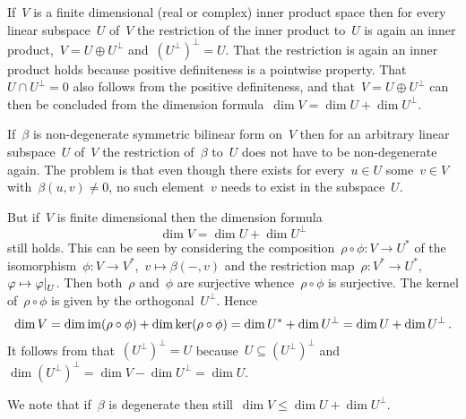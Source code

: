 \begin{recall}
  If~$V$ is a finite dimensional (real or complex) inner product space then for every linear subspace~$U$ of~$V$ the restriction of the inner product to~$U$ is again an inner product,~$V = U \oplus U^\perp$ and~$(U^\perp)^\perp = U$.
  That the restriction is again an inner product holds because positive definiteness is a pointwise property.
  That~$U \cap U^\perp = 0$ also follows from the positive definiteness, and that~$V = U \oplus U^\perp$ can then be concluded from the dimension formula~$\dim V = \dim U + \dim U^\perp$.
  
  If~$\beta$ is non-degenerate symmetric bilinear form on~$V$ then for an arbitrary linear subspace~$U$ of~$V$ the restriction of~$\beta$ to~$U$ does not have to be non-degenerate again.
  The problem is that even though there exists for every~$u \in U$ some~$v \in V$ with~$\beta(u,v) \neq 0$, no such element~$v$ needs to exist in the subspace~$U$.
  
  But if~$V$ is finite dimensional then the dimension formula
  \[
    \dim V
    =
    \dim U + \dim U^\perp
  \]
  still holds.
  This can be seen by considering the composition~$\rho \circ \phi \colon V \to U^*$ of the isomorphism~$\phi \colon V \to V^*$,~$v \mapsto \beta(-,v)$ and the restriction map~$\rho \colon V^* \to U^*$,~$\varphi \mapsto \restrict{\varphi}{U}$.
  Then both~$\rho$ and~$\phi$ are surjective whence~$\rho \circ \phi$ is surjective.
  The kernel of~$\rho \circ \phi$ is given by the orthogonal~$U^\perp$.
  Hence
  \[
    \dim V
    =
    \dim \operatorname{im} (\rho \circ \phi)
    +
    \dim \ker (\rho \circ \phi)
    =
    \dim U^* + \dim U^\perp
    =
    \dim U + \dim U^\perp \,.
  \]
  It follows from that~$(U^\perp)^\perp = U$ because~$U \subseteq (U^\perp)^\perp$ and~$\dim (U^\perp)^\perp = \dim V - \dim U^\perp = \dim U$.
  
  We note that if~$\beta$ is degenerate then still~$\dim V \leq \dim U + \dim U^\perp$.
  

\end{recall}
